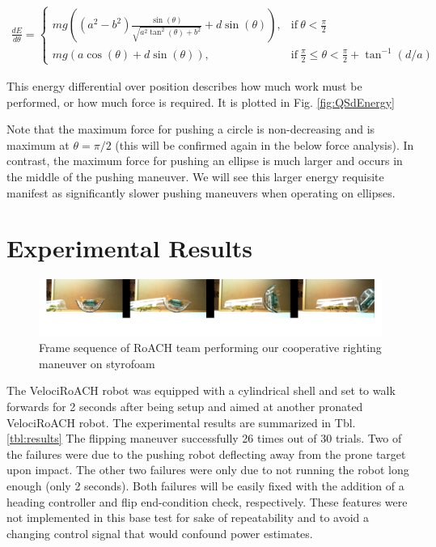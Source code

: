 \documentclass[letterpaper]{report}
\begin{document}
\begin{align}
  \frac{dE}{d\theta} =
  \begin{cases}
    mg ( (a^2 - b^2) \frac{\sin(\theta)}{\sqrt{a^2 \tan^2(\theta) + b^2}} + d \sin(\theta) ), & \text{if}\ \theta < \frac{\pi}{2} \\
    mg (a \cos(\theta) + d \sin(\theta) ), & \text{if}\ \frac{\pi}{2} \leq \theta < \frac{\pi}{2} + \tan^{-1}(d/a)
  \end{cases}
  \label{eq:QSdEnergy}
\end{align}

This energy differential over position describes how much work must be performed, or how much force is required.
It is plotted in Fig. \ref{fig:QSdEnergy}

Note that the maximum force for pushing a circle is non-decreasing and is maximum at $\theta = \pi/2$ (this will be confirmed again in the below force analysis).
In contrast, the maximum force for pushing an ellipse is much larger and occurs in the middle of the pushing maneuver.
We will see this larger energy requisite manifest as significantly slower pushing maneuvers when operating on ellipses.

\section{Experimental Results}
\begin{figure}[ht]
\centering
\includegraphics[width=1.0\textwidth]{QSFlipStrip3.png}
\caption{Frame sequence of RoACH team performing our cooperative righting maneuver on styrofoam}
\end{figure}

The VelociRoACH robot was equipped with a cylindrical shell and set to walk forwards for 2 seconds after being setup and aimed at another pronated VelociRoACH robot.
The experimental results are summarized in Tbl. \ref{tbl:results}
The flipping maneuver successfully 26 times out of 30 trials. Two of the failures were due to the pushing robot deflecting away from the prone target upon impact.
The other two failures were only due to not running the robot long enough (only 2 seconds).
Both failures will be easily fixed with the addition of a heading controller and flip end-condition check, respectively.
These features were not implemented in this base test for sake of repeatability and to avoid a changing control signal that would confound power estimates.
\end{document}

